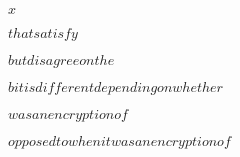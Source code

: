 \documentclass[10pt]{book}
\begin{document}
\begin{mdSnippets}
\begin{mdInlineSnippet}[9dd4e461268c8034f5c8564e155c67a6]%
$x$\end{mdInlineSnippet}%
\begin{mdInlineSnippet}[7a6032b4d9bc67f2e848746e8f53d2fc]%
$ that satisfy $\end{mdInlineSnippet}%
\begin{mdInlineSnippet}[afdbe8b16ac3e175cf50d527032dd8ae]%
$ but disagree on the $\end{mdInlineSnippet}%
\begin{mdInlineSnippet}[698e73bb40a7b029f34625856309e297]%
$ bit is different depending on whether  $\end{mdInlineSnippet}%
\begin{mdInlineSnippet}%
$ was an encryption of $\end{mdInlineSnippet}%
\begin{mdInlineSnippet}[77be21661088d2e72f1b55c273ec4760]%
$ opposed to when it was an encryption of $\end{mdInlineSnippet}%

\end{mdSnippets}
\end{document}
